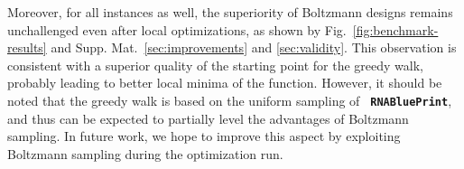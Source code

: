 \documentclass[]{bmcart}
\newcommand{\Obj}{\text{\rm MultiDefect}}
\newcommand{\RNAblueprint}{{\tt \bfseries{}\color{black!85} RNA\textcolor{blue!70!black}{Blue}Print}}
\newcommand{\ourprog}{{\tt \bfseries{}\color{black!85}RNA\textcolor{red!70!black}{Red}Print}}
\begin{document}
%
Moreover, for all instances as well, the superiority of Boltzmann designs
remains unchallenged even after local optimizations, as shown by
Fig.~\ref{fig:benchmark-results} and Supp. Mat.~\ref{sec:improvements}
and \ref{sec:validity}. This observation is consistent with a
superior quality of the starting point for the greedy walk, probably leading
to better local minima of the \Obj{} function. However, it should be noted
that the greedy walk is based on the uniform sampling of
\RNAblueprint{}, and thus can be expected to partially level the
advantages of Boltzmann sampling. In future work, we hope to improve
this aspect by exploiting Boltzmann sampling during the
optimization run.

%
%
\end{document}
